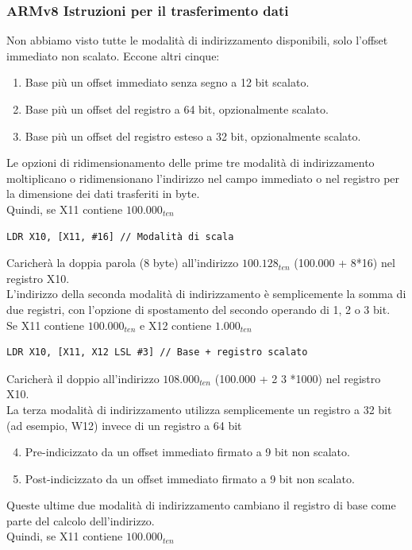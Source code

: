 \documentclass[12pt,a4paper]{article}
\begin{document}
\subsubsection{ARMv8 Istruzioni per il trasferimento dati}
Non abbiamo visto tutte le modalità di indirizzamento disponibili, solo l'offset immediato non scalato.
Eccone altri cinque:
\begin{enumerate}
\item Base più un offset immediato senza segno a 12 bit scalato.
\item Base più un offset del registro a 64 bit, opzionalmente scalato.
\item Base più un offset del registro esteso a 32 bit, opzionalmente scalato.
\end{enumerate}
Le opzioni di ridimensionamento delle prime tre modalità di indirizzamento moltiplicano o ridimensionano l'indirizzo nel campo immediato o nel registro per la dimensione dei dati trasferiti in byte.\\
Quindi, se X11 contiene $100.000_{ten}$
\begin{verbatim}
LDR X10, [X11, #16] // Modalità di scala
\end{verbatim}
Caricherà la doppia parola (8 byte) all'indirizzo $100.128_{ten}$ (100.000 + 8*16) nel registro X10.\\
L'indirizzo della seconda modalità di indirizzamento è semplicemente la somma di due registri, con l'opzione di spostamento del secondo operando di 1, 2 o 3 bit.\\
Se X11 contiene $100.000_{ten}$ e X12 contiene $1.000_{ten}$
\begin{verbatim}
LDR X10, [X11, X12 LSL #3] // Base + registro scalato
\end{verbatim}
Caricherà il doppio all'indirizzo $108.000_{ten}$ (100.000 + 2 3 *1000) nel registro X10.\\
La terza modalità di indirizzamento utilizza semplicemente un registro a 32 bit (ad esempio, W12) invece di un registro a 64 bit
\begin{enumerate}\setcounter{enumi}{3}
\item Pre-indicizzato da un offset immediato firmato a 9 bit non scalato.
\item Post-indicizzato da un offset immediato firmato a 9 bit non scalato.
\end{enumerate}
Queste ultime due modalità di indirizzamento cambiano il registro di base come parte del calcolo dell'indirizzo.\\
Quindi, se X11 contiene $100.000_{ten}$
\end{document}
